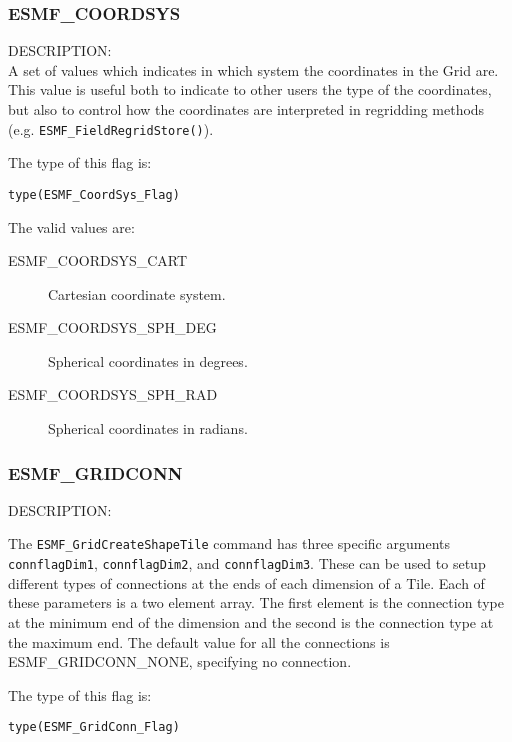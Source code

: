 
\subsubsection{ESMF\_COORDSYS}
\label{const:coordsys}

{\sf DESCRIPTION:\\}
 A set of values which indicates in which system the coordinates in the Grid are. This value is useful both to indicate to 
other users the type of the coordinates, but also to control how the coordinates are interpreted in regridding methods 
(e.g. {\tt ESMF\_FieldRegridStore()}).

The type of this flag is:

{\tt type(ESMF\_CoordSys\_Flag)}

The valid values are:
\begin{description}
\item [ESMF\_COORDSYS\_CART] Cartesian coordinate system. 

\item [ESMF\_COORDSYS\_SPH\_DEG] Spherical coordinates in degrees.

\item [ESMF\_COORDSYS\_SPH\_RAD] Spherical coordinates in radians.
\end{description}


\subsubsection{ESMF\_GRIDCONN}
\label{const:gridconn}

{\sf DESCRIPTION:\\}
\begin{sloppypar}
The {\tt ESMF\_GridCreateShapeTile} command has three specific arguments
{\tt connflagDim1}, {\tt connflagDim2}, and {\tt connflagDim3}. These can be used
to setup different types of connections at the ends of each dimension
of a Tile.  Each of these parameters is a two element array. The first
element is the connection type at the minimum end of the dimension
and the second is the connection type at the maximum end. The default
value for all the connections is ESMF\_GRIDCONN\_NONE, specifying no
connection.
\end{sloppypar}

The type of this flag is:

{\tt type(ESMF\_GridConn\_Flag)}

